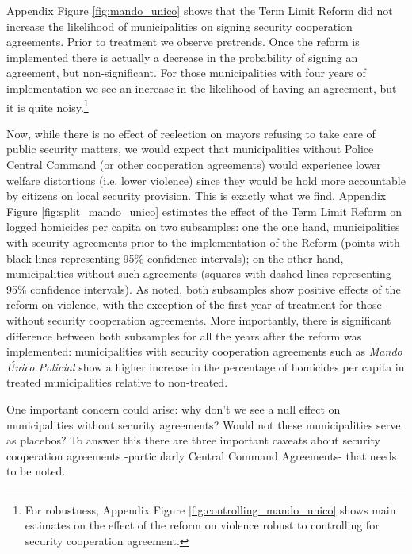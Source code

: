 \documentclass[12pt]{amsart}
\numberwithin{equation}{section}
\theoremstyle{definition}
\theoremstyle{definition}
\theoremstyle{definition}
\begin{document}
\begin{appendix}
Appendix Figure \ref{fig:mando_unico} shows that the Term Limit Reform did not increase the likelihood of municipalities on signing security cooperation agreements. Prior to treatment we observe pretrends. Once the reform is implemented there is actually a decrease in the probability of signing an agreement, but non-significant. For those municipalities with four years of implementation we see an increase in the likelihood of having an agreement, but it is quite noisy.\footnote{For robustness, Appendix Figure \ref{fig:controlling_mando_unico} shows main estimates on the effect of the reform on violence robust to controlling for security cooperation agreement.}   

Now, while there is no effect of reelection on mayors refusing to take care of public security matters, we would expect that municipalities without Police Central Command (or other cooperation agreements) would experience lower welfare distortions (i.e. lower violence) since they would be hold more accountable by citizens on local security provision. This is exactly what we find. Appendix Figure \ref{fig:split_mando_unico} estimates the effect of the Term Limit Reform on logged homicides per capita on two subsamples: one the one hand, municipalities with security agreements prior to the implementation of the Reform (points with black lines representing 95\% confidence intervals); on the other hand, municipalities without such agreements (squares with dashed lines representing 95\% confidence intervals). As noted, both subsamples show positive effects of the reform on violence, with the exception of the first year of treatment for those without security cooperation agreements. More importantly, there is significant difference between both subsamples for all the years after the reform was implemented: municipalities with security cooperation agreements such as \emph{Mando \'Unico Policial} show a higher increase in the percentage of homicides per capita in treated municipalities relative to non-treated. 

One important concern could arise: why don't we see a null effect on municipalities without security agreements? %
Would not these municipalities serve as placebos? To answer this there are three important caveats about security cooperation agreements -particularly Central Command Agreements- that needs to be noted. 


\end{appendix}
\end{document}
